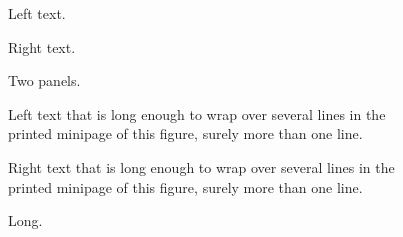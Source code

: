 \documentclass{article}
\begin{document}
\begin{figure}
\begin{minipage}[t]{0.45\textwidth}
Left text.
\end{minipage}\hfill
\begin{minipage}[t]{0.45\textwidth}
Right text.
\end{minipage}
\caption{Two panels.}
\end{figure}
\begin{figure}
\begin{minipage}[t]{0.45\textwidth}
Left text that is long enough to wrap over several lines in the printed minipage of this figure, surely more than one line.
\end{minipage}\hfill
\begin{minipage}[t]{0.45\textwidth}
Right text that is long enough to wrap over several lines in the printed minipage of this figure, surely more than one line.
\end{minipage}
\caption{Long.}
\end{figure}
\end{document}
